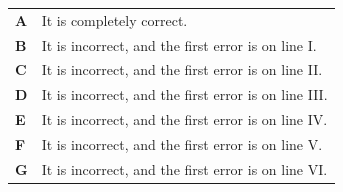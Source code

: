 \documentclass[11pt,a4paper]{article}
\begin{document}
\begin{enumerate}[label=\textbf{\arabic*.},leftmargin=*,itemsep=0pt,start=6]
\par\vspace*{12pt}
\begin{tabularx}{\linewidth}{@{}>{\bfseries}l Y@{}}
A &
It is completely correct.
\\[0.8em]
B &
It is incorrect, and the first error is on line I.
\\[0.8em]
C &
It is incorrect, and the first error is on line II.
\\[0.8em]
D &
It is incorrect, and the first error is on line III.
\\[0.8em]
E &
It is incorrect, and the first error is on line IV.
\\[0.8em]
F &
It is incorrect, and the first error is on line V.
\\[0.8em]
G &
It is incorrect, and the first error is on line VI.
\\
\end{tabularx}
\end{enumerate}
\clearpage
\thispagestyle{djspaper}
\vspace*{8pt}
\end{document}
